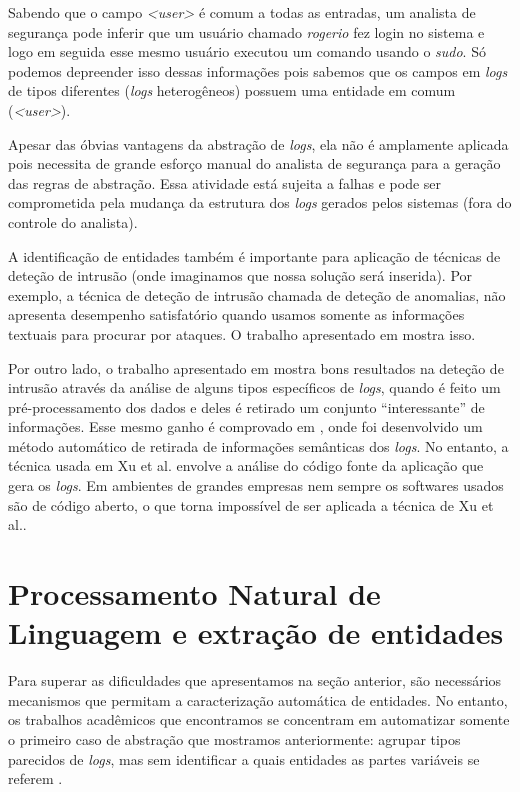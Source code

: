 \documentclass[
	12pt,				%
	openright,			%
	twoside,			%
	a4paper,			%
	english,			%
	spanish,			%
	brazil,				%
	]{abntex2}
\begin{document}
Sabendo que o campo \emph{<user>} é comum a todas as entradas, um analista de segurança pode inferir que um usuário chamado \emph{rogerio} fez login no sistema e logo em seguida esse mesmo usuário executou um comando usando o \emph{sudo}. Só podemos depreender isso dessas informações pois sabemos que os campos em \emph{logs} de tipos diferentes (\emph{logs} heterogêneos) possuem uma entidade em comum (\emph{<user>}).

Apesar das óbvias vantagens da abstração de \emph{logs}, ela não é amplamente aplicada pois necessita de grande esforço manual do analista de segurança para a geração das regras de abstração. Essa atividade está sujeita a falhas e pode ser comprometida pela mudança da estrutura dos \emph{logs} gerados pelos sistemas (fora do controle do analista).

A identificação de entidades também é importante para aplicação de técnicas de deteção de intrusão (onde imaginamos que nossa solução será inserida). Por exemplo, a técnica de deteção de intrusão chamada de deteção de anomalias, não apresenta desempenho satisfatório quando usamos somente as informações textuais para procurar por ataques. O trabalho apresentado em \cite{li2013automatic} mostra isso.

Por outro lado, o trabalho apresentado em \cite{yen2013beehive} mostra bons resultados na deteção de intrusão através da análise de alguns tipos específicos de \emph{logs}, quando é feito um pré-processamento dos dados e deles é retirado um conjunto ``interessante'' de informações. Esse mesmo ganho é comprovado em \cite{xu2009detecting}, onde foi desenvolvido um método automático de retirada de informações semânticas dos \emph{logs}. No entanto, a técnica usada em Xu et al. envolve a análise do código fonte da aplicação que gera os \emph{logs}. Em ambientes de grandes empresas nem sempre os softwares usados são de código aberto, o que torna impossível de ser aplicada a técnica de Xu et al..

\section{Processamento Natural de Linguagem e extração de entidades}
Para superar as dificuldades que apresentamos na seção anterior, são necessários mecanismos que permitam a caracterização automática de entidades. No entanto, os trabalhos acadêmicos que encontramos se concentram em automatizar somente o primeiro caso de abstração que mostramos anteriormente: agrupar tipos parecidos de \emph{logs}, mas sem identificar a quais entidades as partes variáveis se referem \cite{vaarandi2003data, nagappan2010abstracting}.
\end{document}
